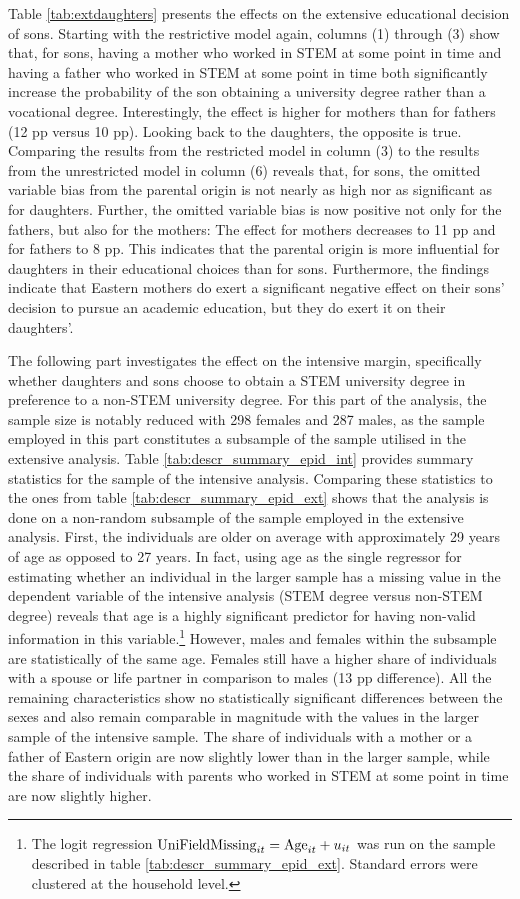 \documentclass[a4paper, oneside, hyperfootnotes = false]{article}
\begin{document}
{Table \ref{tab:extdaughters} presents the effects on the extensive educational decision of sons.
Starting with the restrictive model again, columns (1) through (3) show that, for sons, having a mother who worked in STEM at some point in time and having a father who worked in STEM at some point in time both significantly increase the probability of the son obtaining a university degree rather than a vocational degree.
Interestingly, the effect is higher for mothers than for fathers (12 pp versus 10 pp).
Looking back to the daughters, the opposite is true.
Comparing the results from the restricted model in column (3) to the results from the unrestricted model in column (6) reveals that, for sons, the omitted variable bias from the parental origin is not nearly as high nor as significant as for daughters.
Further, the omitted variable bias is now positive not only for the fathers, but also for the mothers:
The effect for mothers decreases to 11 pp and for fathers to 8 pp.
This indicates that the parental origin is more influential for daughters in their educational choices than for sons.
Furthermore, the findings indicate that Eastern mothers do exert a significant negative effect on their sons' decision to pursue an academic education, but they do exert it on their daughters'.

The following part investigates the effect on the intensive margin, specifically whether daughters and sons choose to obtain a STEM university degree in preference to a non-STEM university degree.
For this part of the analysis, the sample size is notably reduced with 298 females and 287 males, as the sample employed in this part constitutes a subsample of the sample utilised in the extensive analysis.
Table \ref{tab:descr_summary_epid_int} provides summary statistics for the sample of the intensive analysis.
Comparing these statistics to the ones from table \ref{tab:descr_summary_epid_ext} shows that the analysis is done on a non-random subsample of the sample employed in the extensive analysis.
First, the individuals are older on average with approximately 29 years of age as opposed to 27 years.
In fact, using age as the single regressor for estimating whether an individual in the larger sample has a missing value in the dependent variable of the intensive analysis (STEM degree versus non-STEM degree) reveals that age is a highly significant predictor for having non-valid information in this variable.\footnote{The logit regression $\textnormal{UniFieldMissing}_{it} = \textnormal{Age}_{it} + u_{it}$ was run on the sample described in table \ref{tab:descr_summary_epid_ext}. Standard errors were clustered at the household level.}
However, males and females within the subsample are statistically of the same age.
Females still have a higher share of individuals with a spouse or life partner in comparison to males (13 pp difference).
All the remaining characteristics  show no statistically significant differences between the sexes and also remain comparable in magnitude with the values in the larger sample of the intensive sample.
The share of individuals with a mother or a father of Eastern origin are now slightly lower than in the larger sample, while the share of individuals with parents who worked in STEM at some point in time are now slightly higher.

}
\end{document}
